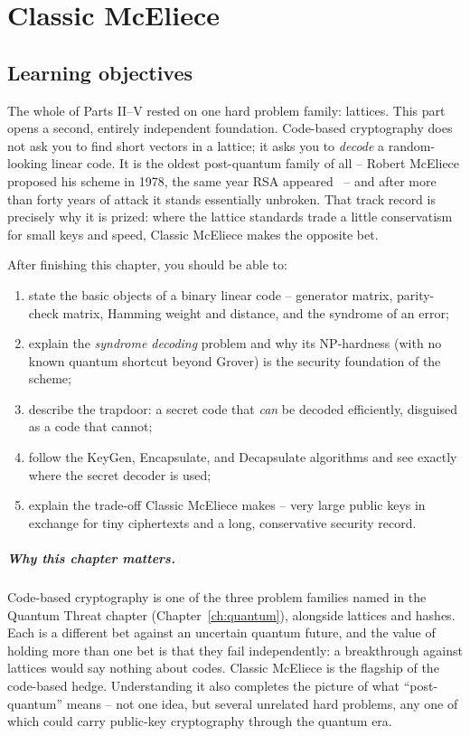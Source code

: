\chapter{Classic McEliece}
\label{ch:mceliece}

\section{Learning objectives}

The whole of Parts II--V rested on one hard problem family: lattices. This part opens a second, entirely independent foundation. Code-based cryptography does not ask you to find short vectors in a lattice; it asks you to \emph{decode} a random-looking linear code. It is the oldest post-quantum family of all -- Robert McEliece proposed his scheme in 1978, the same year RSA appeared~\cite{mceliece1978} -- and after more than forty years of attack it stands essentially unbroken. That track record is precisely why it is prized: where the lattice standards trade a little conservatism for small keys and speed, Classic McEliece makes the opposite bet.

After finishing this chapter, you should be able to:

\begin{enumerate}
  \item state the basic objects of a binary linear code -- generator matrix, parity-check matrix, Hamming weight and distance, and the syndrome of an error;
  \item explain the \emph{syndrome decoding} problem and why its NP-hardness (with no known quantum shortcut beyond Grover) is the security foundation of the scheme;
  \item describe the trapdoor: a secret code that \emph{can} be decoded efficiently, disguised as a code that cannot;
  \item follow the KeyGen, Encapsulate, and Decapsulate algorithms and see exactly where the secret decoder is used;
  \item explain the trade-off Classic McEliece makes -- very large public keys in exchange for tiny ciphertexts and a long, conservative security record.
\end{enumerate}

\paragraph{Why this chapter matters.}
Code-based cryptography is one of the three problem families named in the Quantum Threat chapter (Chapter~\ref{ch:quantum}), alongside lattices and hashes. Each is a different bet against an uncertain quantum future, and the value of holding more than one bet is that they fail independently: a breakthrough against lattices would say nothing about codes. Classic McEliece is the flagship of the code-based hedge. Understanding it also completes the picture of what ``post-quantum'' means -- not one idea, but several unrelated hard problems, any one of which could carry public-key cryptography through the quantum era.

